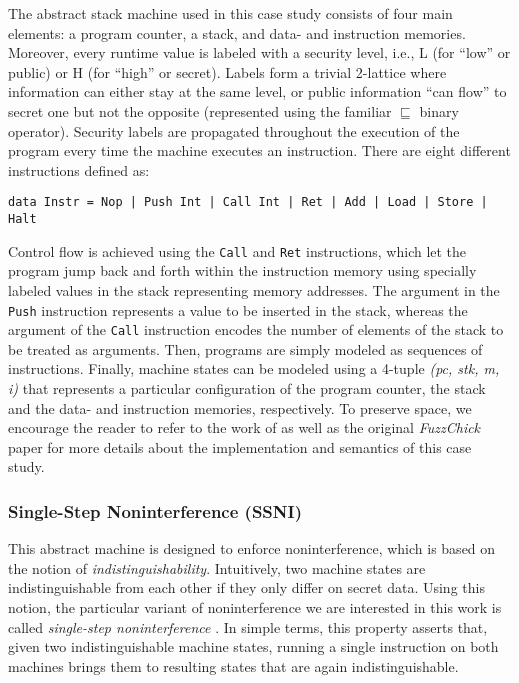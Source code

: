 \documentclass[sigconf, anonymous]{acmart}
\newcommand{\fuzzchick}{\textit{FuzzChick}\xspace}
\begin{document}
The abstract stack machine used in this case study consists of four main
elements: a program counter, a stack, and data- and instruction memories.
%
Moreover, every runtime value is labeled with a security level, i.e., L (for
``low'' or public) or H (for ``high'' or secret).
%
Labels form a trivial 2-lattice where information can either stay at the same
level, or public information ``can flow'' to secret one but not the opposite
(represented using the familiar $\sqsubseteq$ binary operator).
%
Security labels are propagated throughout the execution of the program every
time the machine executes an instruction.
%
There are eight different instructions defined as:
%
\begin{verbatim}
data Instr = Nop | Push Int | Call Int | Ret | Add | Load | Store | Halt
\end{verbatim}

\noindent Control flow is achieved using the \texttt{Call} and \texttt{Ret}
instructions, which let the program jump back and forth within the instruction
memory using specially labeled values in the stack representing memory
addresses.
%
The argument in the \texttt{Push} instruction represents a value to be
inserted in the stack, whereas the argument of the \texttt{Call} instruction
encodes the number of elements of the stack to be treated as arguments.
%
Then, programs are simply modeled as sequences of instructions.
%
Finally, machine states can be modeled using a 4-tuple \textit{(pc, stk, m, i)}
that represents a particular configuration of the program counter, the stack and
the data- and instruction memories, respectively.
%
To preserve space, we encourage the reader to refer to the work of
\citeauthor{hritcu2013testing} \citeyearpar{hritcu2013testing,
  hrictcu2016testing} as well as the original \fuzzchick paper for more details
about the implementation and semantics of this case study.

\subsubsection{Single-Step Noninterference (SSNI)}

This abstract machine is designed to enforce noninterference, which is based on
the notion of \emph{indistinguishability}.
%
Intuitively, two machine states are indistinguishable from each other if they
only differ on secret data.
%
Using this notion, the particular variant of noninterference we are interested
in this work is called \emph{single-step noninterference}
\cite{hritcu2013testing}.
%
In simple terms, this property asserts that, given two indistinguishable machine
states, running a single instruction on both machines brings them to resulting
states that are again indistinguishable.
\end{document}
